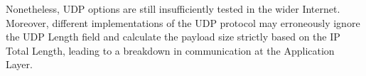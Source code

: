 Nonetheless, UDP options are still insufficiently tested in the wider Internet.
Moreover, different implementations of the UDP protocol may erroneously ignore
the UDP Length field and calculate the payload size strictly based on the
IP Total Length, leading to a breakdown in communication at the Application
Layer.

